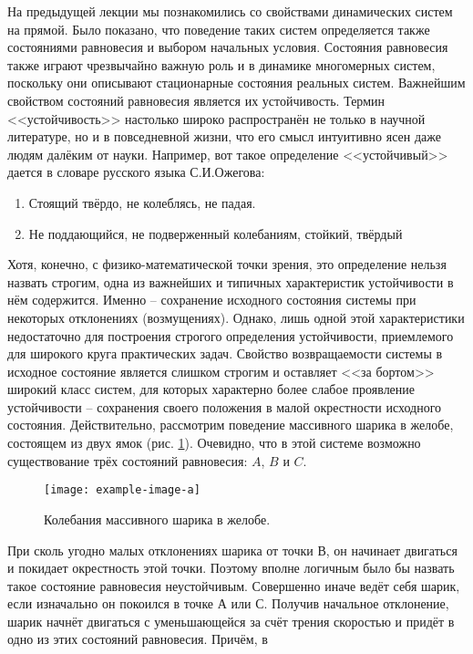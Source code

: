 
На предыдущей лекции мы познакомились со свойствами динамических систем на прямой. Было показано, что поведение таких систем определяется также состояниями равновесия и выбором начальных условия. Состояния равновесия также играют чрезвычайно важную роль и в динамике многомерных систем, поскольку они описывают стационарные состояния реальных систем. Важнейшим свойством состояний равновесия является их устойчивость. Термин <<устойчивость>> настолько широко распространён не только в научной литературе, но и в повседневной жизни, что его смысл интуитивно ясен даже людям далёким от науки. Например, вот такое определение <<устойчивый>> дается в словаре русского языка С.И.Ожегова:
\begin{enumerate}
    \item Стоящий твёрдо, не колеблясь, не падая.
    \item Не поддающийся, не подверженный колебаниям, стойкий, твёрдый
\end{enumerate}
Хотя, конечно, с физико-математической точки зрения, это определение нельзя назвать строгим,  одна из важнейших и типичных характеристик устойчивости в нём содержится. Именно -- сохранение исходного состояния системы при некоторых отклонениях (возмущениях). Однако, лишь одной этой характеристики недостаточно для построения строгого определения устойчивости, приемлемого для широкого круга практических задач. Свойство возвращаемости системы в исходное состояние является слишком строгим и оставляет <<за бортом>> широкий класс систем, для которых характерно более слабое проявление устойчивости -- сохранения своего положения в малой окрестности исходного состояния. Действительно, рассмотрим поведение массивного шарика в желобе, состоящем из двух ямок (рис. \ref{fig:3.1}). Очевидно, что в этой системе возможно  существование трёх состояний   равновесия:
$A$, $B$ и $C$. 
\begin{figure}[h!]
    \centering
    \texttt{[image: example-image-a]}
    \label{fig:3.1}
    \caption{Колебания массивного шарика в желобе. }
\end{figure}
При сколь угодно малых отклонениях шарика от точки В, он начинает
двигаться и покидает окрестность этой точки. Поэтому вполне логичным было
бы назвать такое состояние равновесия неустойчивым. Совершенно иначе ведёт
себя шарик, если изначально он покоился в точке А или С. Получив начальное
отклонение, шарик начнёт двигаться с уменьшающейся за счёт трения
скоростью и придёт в одно из этих состояний равновесия. Причём, в
